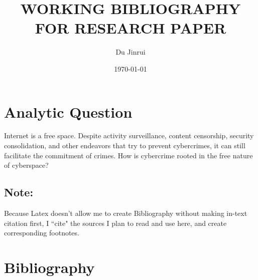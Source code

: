 \documentclass{article}
\title{WORKING BIBLIOGRAPHY FOR RESEARCH PAPER}
\author{Du Jinrui}
\date{\today}
\begin{document}
\maketitle

\section*{Analytic Question}
Internet is a free space. Despite activity surveillance, content censorship, security consolidation, and other endeavors that try to prevent cybercrimes, it can still facilitate the commitment of crimes. How is cybercrime rooted in the free nature of cyberspace?

\subsection*{Note:}
Because Latex doesn't allow me to create Bibliography without making in-text citation first, I ``cite" the sources I plan to read and use here,
\autocite{kant_2000}
\autocite{walsh_2015}
\autocite{Vogt2021}
\autocite{10.2307/resrep04074}
\autocite{10.2307/resrep05239.6}
and create corresponding footnotes.

\section*{Bibliography}
\printbibliography[heading=none]
\end{document}
